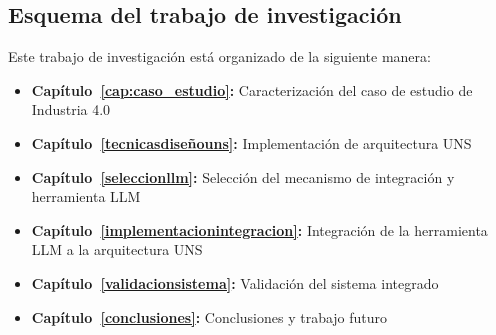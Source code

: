 \subsection*{\centering Esquema del trabajo de investigación}

Este trabajo de investigación está organizado de la siguiente manera:

\begin{itemize}
    \item  \textbf{Capítulo~\ref{cap:caso_estudio}:} Caracterización del caso de estudio de Industria 4.0
    \item  \textbf{Capítulo~\ref{tecnicasdiseñouns}:} Implementación de arquitectura UNS
    \item  \textbf{Capítulo~\ref{seleccionllm}:} Selección del mecanismo de integración y herramienta LLM
    \item  \textbf{Capítulo~\ref{implementacionintegracion}:} Integración de la herramienta LLM a la arquitectura UNS
    \item  \textbf{Capítulo~\ref{validacionsistema}:} Validación del sistema integrado
    \item  \textbf{Capítulo~\ref{conclusiones}:} Conclusiones y trabajo futuro

\end{itemize}
\color{black}